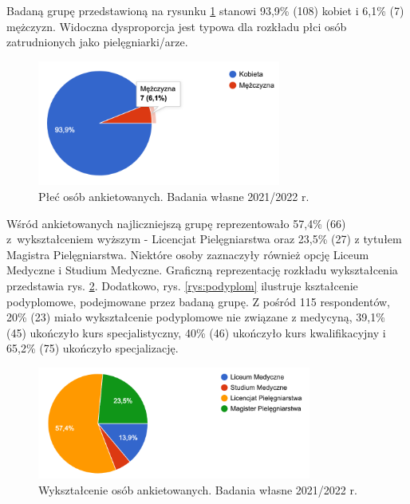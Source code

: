 \documentclass[a4paper,12pt,twoside,openright]{mwrep}
\begin{document}
Badaną grupę przedstawioną  na rysunku \ref{rys:plec} stanowi  93,9\%  (108) kobiet i  6,1\%  (7) mężczyzn. Widoczna dysproporcja jest typowa dla rozkładu płci osób zatrudnionych jako pielęgniarki/arze.

\begin{figure}[H]
\centering
\includegraphics[width=8cm]{char_gr_bad/plec00}
\caption{Płeć osób ankietowanych. Badania własne 2021/2022 r.}
\label{rys:plec}
\end{figure}



Wśród ankietowanych najliczniejszą grupę reprezentowało 57,4\% (66) z~wykształceniem wyższym - Licencjat Pielęgniarstwa oraz  23,5\%  (27) z tytułem Magistra Pielęgniarstwa. Niektóre osoby zaznaczyły również opcję Liceum Medyczne i  Studium Medyczne. Graficzną reprezentację rozkładu wykształcenia przedstawia rys. \ref{rys:wykszt}. Dodatkowo, rys. \ref{rys:podyplom} ilustruje kształcenie podyplomowe, podejmowane przez badaną grupę. Z pośród 115 respondentów, 20\% (23) miało wykształcenie podyplomowe nie związane z medycyną, 39,1\% (45) ukończyło kurs specjalistyczny, 40\% (46) ukończyło kurs kwalifikacyjny i 
65,2\% (75) ukończyło specjalizację.  


\begin{figure}[H]
\centering
\includegraphics[width=9cm]{char_gr_bad/wyksztalc00}
\caption{Wykształcenie osób ankietowanych. Badania własne 2021/2022 r.}
\label{rys:wykszt}
\end{figure}
\end{document}
